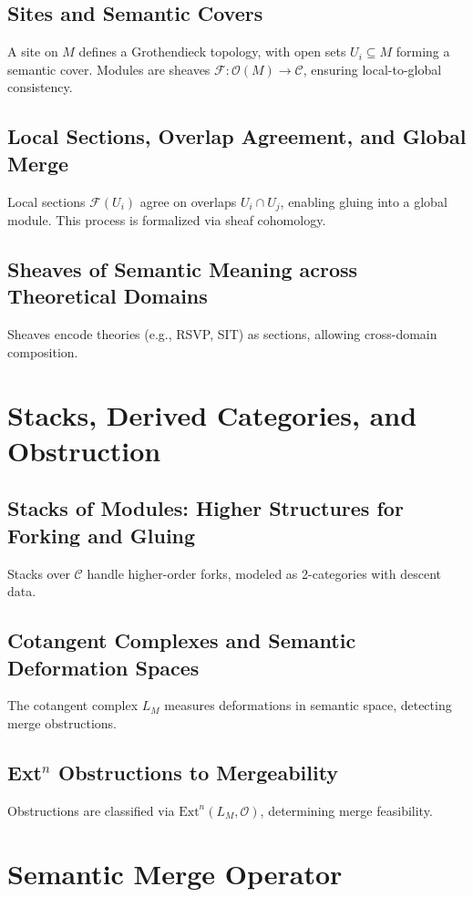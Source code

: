 \documentclass[12pt]{article}
\begin{document}
\subsection{Sites and Semantic Covers}
A site on $M$ defines a Grothendieck topology, with open sets $U_i \subseteq M$ forming a semantic cover. Modules are sheaves $\mathcal{F}: \mathcal{O}(M) \to \mathcal{C}$, ensuring local-to-global consistency.

\subsection{Local Sections, Overlap Agreement, and Global Merge}
Local sections $\mathcal{F}(U_i)$ agree on overlaps $U_i \cap U_j$, enabling gluing into a global module. This process is formalized via sheaf cohomology.

\subsection{Sheaves of Semantic Meaning across Theoretical Domains}
Sheaves encode theories (e.g., RSVP, SIT) as sections, allowing cross-domain composition.

\section{Stacks, Derived Categories, and Obstruction}
\subsection{Stacks of Modules: Higher Structures for Forking and Gluing}
Stacks over $\mathcal{C}$ handle higher-order forks, modeled as 2-categories with descent data.

\subsection{Cotangent Complexes and Semantic Deformation Spaces}
The cotangent complex $L_M$ measures deformations in semantic space, detecting merge obstructions.

\subsection{Ext$^n$ Obstructions to Mergeability}
Obstructions are classified via $\text{Ext}^n(L_M, \mathcal{O})$, determining merge feasibility.

\section{Semantic Merge Operator}
\end{document}
